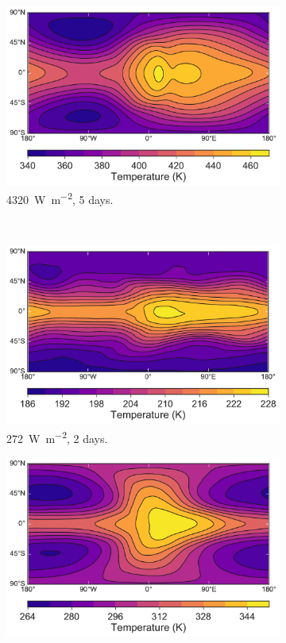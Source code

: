 \begin{figure}
\begin{subfigure}[b]{0.32\textwidth}
      \includegraphics[width=\textwidth]{figures/wave-mean-flow/ar_highT_5day.pdf}
      \caption{\SI{4320}{\watt\per\metre\squared}, 5 days.}
      \label{fig:spherical-high-omega}
      \end{subfigure}
     \\
      \begin{subfigure}[b]{0.32\textwidth}
        \includegraphics[width=\textwidth]{figures/wave-mean-flow/ar_lowT_2day.pdf}
        \caption{\SI{272}{\watt\per\metre\squared}, 2 days.}
        \label{fig:spherical-low-omega}
      \end{subfigure}
      \begin{subfigure}[b]{0.32\textwidth}
        \includegraphics[width=\textwidth]{figures/wave-mean-flow/ar_mediumT_2day.pdf}

\end{subfigure}
\end{figure}
